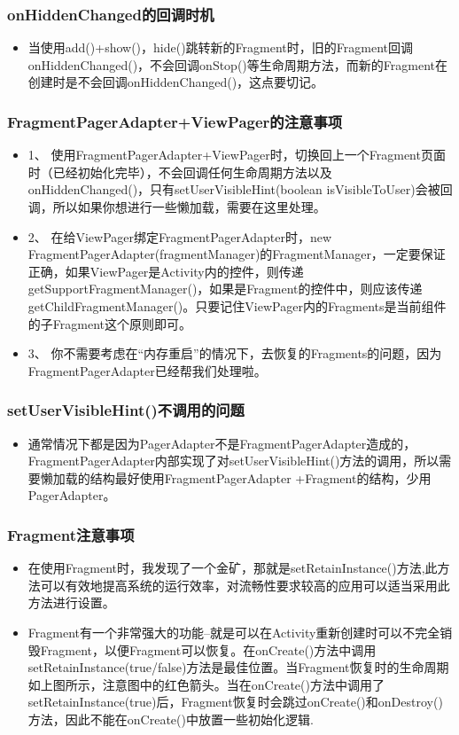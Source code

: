 \documentclass[9pt, b5paper]{article}
\begin{document}
\subsubsection{onHiddenChanged的回调时机}
\label{sec-1-2-5}
\begin{itemize}
\item 当使用add()+show()，hide()跳转新的Fragment时，旧的Fragment回调onHiddenChanged()，不会回调onStop()等生命周期方法，而新的Fragment在创建时是不会回调onHiddenChanged()，这点要切记。
\end{itemize}
\subsubsection{FragmentPagerAdapter+ViewPager的注意事项}
\label{sec-1-2-6}
\begin{itemize}
\item 1、 使用FragmentPagerAdapter+ViewPager时，切换回上一个Fragment页面时（已经初始化完毕），不会回调任何生命周期方法以及onHiddenChanged()，只有setUserVisibleHint(boolean isVisibleToUser)会被回调，所以如果你想进行一些懒加载，需要在这里处理。
\item 2、 在给ViewPager绑定FragmentPagerAdapter时，new FragmentPagerAdapter(fragmentManager)的FragmentManager，一定要保证正确，如果ViewPager是Activity内的控件，则传递getSupportFragmentManager()，如果是Fragment的控件中，则应该传递getChildFragmentManager()。只要记住ViewPager内的Fragments是当前组件的子Fragment这个原则即可。
\item 3、 你不需要考虑在“内存重启”的情况下，去恢复的Fragments的问题，因为FragmentPagerAdapter已经帮我们处理啦。
\end{itemize}
\subsubsection{setUserVisibleHint()不调用的问题}
\label{sec-1-2-7}
\begin{itemize}
\item 通常情况下都是因为PagerAdapter不是FragmentPagerAdapter造成的，FragmentPagerAdapter内部实现了对setUserVisibleHint()方法的调用，所以需要懒加载的结构最好使用FragmentPagerAdapter +Fragment的结构，少用PagerAdapter。
\end{itemize}

\subsubsection{Fragment注意事项}
\label{sec-1-2-8}
\begin{itemize}
\item 在使用Fragment时，我发现了一个金矿，那就是setRetainInstance()方法,此方法可以有效地提高系统的运行效率，对流畅性要求较高的应用可以适当采用此方法进行设置。
\item Fragment有一个非常强大的功能--就是可以在Activity重新创建时可以不完全销毁Fragment，以便Fragment可以恢复。在onCreate()方法中调用setRetainInstance(true/false)方法是最佳位置。当Fragment恢复时的生命周期如上图所示，注意图中的红色箭头。当在onCreate()方法中调用了setRetainInstance(true)后，Fragment恢复时会跳过onCreate()和onDestroy()方法，因此不能在onCreate()中放置一些初始化逻辑.
\end{itemize}
\end{document}
